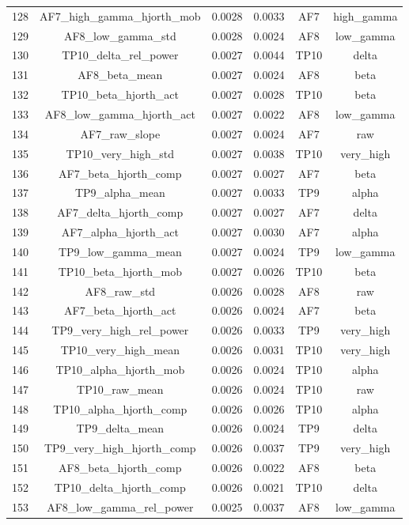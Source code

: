 \begin{table}[hptb]
\begin{table}
\begin{tabular}{cccccc}
128 & AF7_high_gamma_hjorth_mob & 0.0028 & 0.0033 & AF7 & high_gamma \\
129 & AF8_low_gamma_std & 0.0028 & 0.0024 & AF8 & low_gamma \\
130 & TP10_delta_rel_power & 0.0027 & 0.0044 & TP10 & delta \\
131 & AF8_beta_mean & 0.0027 & 0.0024 & AF8 & beta \\
132 & TP10_beta_hjorth_act & 0.0027 & 0.0028 & TP10 & beta \\
133 & AF8_low_gamma_hjorth_act & 0.0027 & 0.0022 & AF8 & low_gamma \\
134 & AF7_raw_slope & 0.0027 & 0.0024 & AF7 & raw \\
135 & TP10_very_high_std & 0.0027 & 0.0038 & TP10 & very_high \\
136 & AF7_beta_hjorth_comp & 0.0027 & 0.0027 & AF7 & beta \\
137 & TP9_alpha_mean & 0.0027 & 0.0033 & TP9 & alpha \\
138 & AF7_delta_hjorth_comp & 0.0027 & 0.0027 & AF7 & delta \\
139 & AF7_alpha_hjorth_act & 0.0027 & 0.0030 & AF7 & alpha \\
140 & TP9_low_gamma_mean & 0.0027 & 0.0024 & TP9 & low_gamma \\
141 & TP10_beta_hjorth_mob & 0.0027 & 0.0026 & TP10 & beta \\
142 & AF8_raw_std & 0.0026 & 0.0028 & AF8 & raw \\
143 & AF7_beta_hjorth_act & 0.0026 & 0.0024 & AF7 & beta \\
144 & TP9_very_high_rel_power & 0.0026 & 0.0033 & TP9 & very_high \\
145 & TP10_very_high_mean & 0.0026 & 0.0031 & TP10 & very_high \\
146 & TP10_alpha_hjorth_mob & 0.0026 & 0.0024 & TP10 & alpha \\
147 & TP10_raw_mean & 0.0026 & 0.0024 & TP10 & raw \\
148 & TP10_alpha_hjorth_comp & 0.0026 & 0.0026 & TP10 & alpha \\
149 & TP9_delta_mean & 0.0026 & 0.0024 & TP9 & delta \\
150 & TP9_very_high_hjorth_comp & 0.0026 & 0.0037 & TP9 & very_high \\
151 & AF8_beta_hjorth_comp & 0.0026 & 0.0022 & AF8 & beta \\
152 & TP10_delta_hjorth_comp & 0.0026 & 0.0021 & TP10 & delta \\
153 & AF8_low_gamma_rel_power & 0.0025 & 0.0037 & AF8 & low_gamma \\

\end{tabular}
\end{table}
\end{table}
